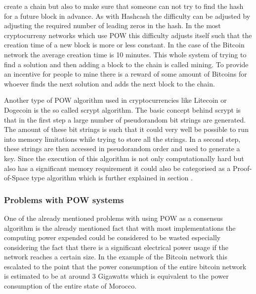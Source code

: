 create a chain but also to make sure that someone can not try to find the hash for a future block in advance. As with Hashcash the difficulty can be adjusted by adjusting the required number of
leading zeros in the hash. In the most cryptocurreny networks which use POW this difficulty adjusts itself such that the creation time of a new block is more or less constant. In the case of the
Bitcoin network the average creation time is 10 minutes. This whole system of trying to find a solution and then adding a block to the chain is called mining. To provide an incentive for people to
mine there is a reward of some amount of Bitcoins for whoever finds the next solution and adds the next block to the chain.\cite{url:bitcoin}\par Another type of POW algorithm used in cryptocurrencies
like Litecoin or Dogecoin is the so called scrypt algorithm.\cite{url:litecoin_dogecoin} The basic concept behind scrypt is that in the first step a large number of pseudorandom bit strings are
generated. The amount of these bit strings is such that it could very well be possible to run into memory limitations while trying to store all the strings. In a second step, these strings are then
accessed in pseudorandom order and used to generate a key. Since the execution of this algorithm is not only computationally hard but also has a significant memory requirement it could also be
categorised as a Proof-of-Space type algorithm\cite{url:scrypt} which is further explained in section .

\subsubsection{Problems with POW systems}

One of the already mentioned problems with using POW as a consensus algorithm is the already mentioned fact that with most implementations the computing power expended could be considered to be wasted
especially considering the fact that there is a significant electrical power usage if the network reaches a certain size. In the example of the Bitcoin network this escalated to the point that the
power consumption of the entire bitcoin network is estimated to be at around 3 Gigawatts which is equivalent to the power consumption of the entire state of Morocco.\cite{url:btc_power}

